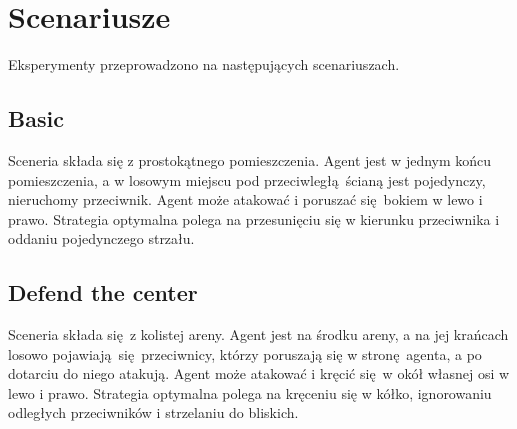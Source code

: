 \section{Scenariusze}
Eksperymenty przeprowadzono na następujących scenariuszach.

\subsection{Basic}
Sceneria składa się z prostokątnego pomieszczenia. Agent jest w jednym końcu pomieszczenia, a w losowym miejscu pod przeciwległą ścianą jest pojedynczy, nieruchomy przeciwnik. Agent może atakować i poruszać się bokiem w lewo i prawo. Strategia optymalna polega na przesunięciu się w kierunku przeciwnika i oddaniu pojedynczego strzału.
\subsection{Defend the center}
Sceneria składa się z kolistej areny. Agent jest na środku areny, a na jej krańcach losowo pojawiają się przeciwnicy, którzy poruszają się w stronę agenta, a po dotarciu do niego atakują. Agent może atakować i kręcić się w okół własnej osi w lewo i prawo. Strategia optymalna polega na kręceniu się w kółko, ignorowaniu odległych przeciwników i strzelaniu do bliskich.
